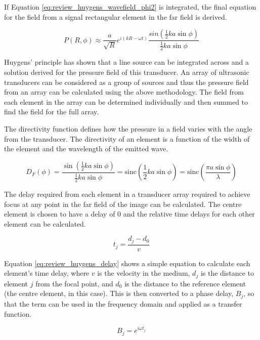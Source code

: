If Equation \ref{eq:review_huygens_wavefield_phi2} is integrated, the final equation for the field from a signal rectangular element in the far field is derived.

\begin{equation} \label{eq:review_huygens_wavefield_solved}
P(R,\phi) \approx \frac{a}{\sqrt{R}} e^{i(kR - \omega t)} \frac{sin(\frac{1}{2} ka \sin\phi)}{\frac{1}{2} ka \sin\phi}
\end{equation}

Huygens' principle has shown that a line source can be integrated across and a solution derived for the pressure field of this transducer. An array of ultrasonic transducers can be considered as a group of sources and thus the pressure field from an array can be calculated using the above methodology. The field from each element in the array can be determined individually and then summed to find the field for the full array. 

The directivity function defines how the pressure in a field varies with the angle from the transducer. The directivity of an element is a function of the width of the element and the wavelength of the emitted wave.

\begin{equation} \label{eq:review_huygens_directivity}
D_F(\phi) = \frac{\sin(\frac{1}{2} ka \sin\phi)}{\frac{1}{2} ka \sin\phi} = \textrm{sinc}( \frac{1}{2} ka \sin\phi ) = \textrm{sinc}(\frac{\pi a \sin \phi}{\lambda})
\end{equation}

The delay required from each element in a transducer array required to achieve focus at any point in the far field of the image can be calculated. The centre element is chosen to have a delay of $0$ and the relative time delays for each other element can be calculated.

\begin{equation} \label{eq:review_huygens_delay}
t_j = \frac{d_j - d_0}{v}
\end{equation}

Equation \ref{eq:review_huygens_delay} shows a simple equation to calculate each element's time delay, where $v$ is the velocity in the medium, $d_j$ is the distance to element $j$ from the focal point, and $d_0$ is the distance to the reference element (the centre element, in this case). This is then converted to a phase delay, $B_j$, so that the term can be used in the frequency domain and applied as a transfer function.

\begin{equation} \label{eq:review_huygens_delay_phase}
B_j = e^{i\omega t_j}
\end{equation}

